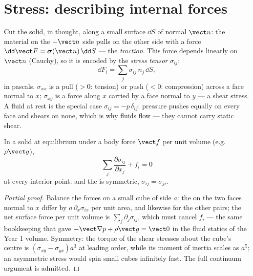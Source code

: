 \section{Stress: describing internal forces}

\begin{definition}\label{def:b3:continuum-elasticity:stress}
Cut the solid, in thought, along a small surface $\dd S$ of normal
$\vect n$: the material on the $+\vect n$ side pulls on the other side
with a force $\dd\vect F = \boldsymbol\sigma(\vect n)\,\dd S$ --- the
\emph{traction}. This force depends linearly on $\vect n$ (Cauchy),
so it is encoded by the \emph{stress tensor} $\sigma_{ij}$:
\[
\dd F_i = \sum_j \sigma_{ij}\,n_j\,\dd S ,
\]
in pascals. $\sigma_{xx}$ is a pull ($> 0$: tension) or push ($< 0$:
compression) across a face normal to $x$; $\sigma_{xy}$ is a force
along $x$ carried by a face normal to $y$ --- a shear stress. A fluid
at rest is the special case $\sigma_{ij} = -p\,\delta_{ij}$: pressure
pushes equally on every face and shears on none, which is why fluids
flow --- they cannot carry static shear.
\end{definition}

\begin{proposition}\label{prop:b3:continuum-elasticity:equilibrium}
In a solid at equilibrium under a body force $\vect f$ per unit
volume (e.g.\ $\rho\vect g$),
\[
\sum_j\frac{\partial\sigma_{ij}}{\partial x_j} + f_i = 0
\]
at every interior point; and the  is symmetric,
$\sigma_{ij} = \sigma_{ji}$.
\end{proposition}

\begin{proof}[Partial proof]
Balance the forces on a small cube of side $a$: the  on the
two faces normal to $x$ differ by $a\,\partial_x\sigma_{ix}$ per unit
area, and likewise for the other pairs; the net surface force per unit
volume is $\sum_j\partial_j\sigma_{ij}$, which must cancel $f_i$ ---
the same bookkeeping that gave $-\vect\nabla p + \rho\vect g = \vect 0$
in the fluid statics of the Year 1 volume. Symmetry: the torque of the
shear stresses about the cube's centre is $(\sigma_{xy} -
\sigma_{yx})a^3$ at leading order, while its moment of inertia scales
as $a^5$; an asymmetric stress would spin small cubes infinitely fast.
The full continuum argument is admitted.
\end{proof}

